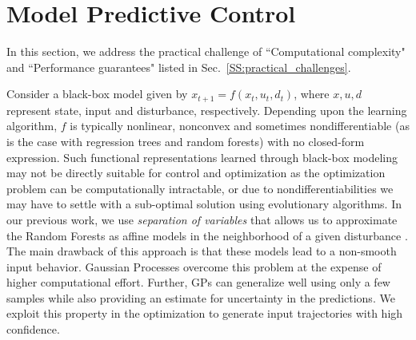 \section{Model Predictive Control}
\label{S:dpc}

In this section, we address the practical challenge of ``Computational complexity" and ``Performance guarantees" listed in Sec.~\ref{SS:practical_challenges}.

Consider a black-box model given by $x_{t+1}=f(x_t,u_t,d_t)$, where $x,u,d$ represent state, input and disturbance, respectively. Depending upon the learning algorithm, $f$ is typically nonlinear, nonconvex and sometimes nondifferentiable (as is the case with regression trees and random forests) with no closed-form expression. 
Such functional representations learned through black-box modeling may not be directly suitable for control and optimization as the optimization problem can be computationally intractable, or due to nondifferentiabilities we may have to settle with a sub-optimal solution using evolutionary algorithms. 
In our previous work, we use \textit{separation of variables} that allows us to approximate the Random Forests as affine models in the neighborhood of a given disturbance \cite{JainACC2017,JainCDC2017}. 
The main drawback of this approach is that these models lead to a non-smooth input behavior. 
Gaussian Processes overcome this problem at the expense of higher computational effort.
Further, GPs can generalize well using only a few samples while also providing an estimate for uncertainty in the predictions. 
We exploit this property in the optimization to generate input trajectories with high confidence.


